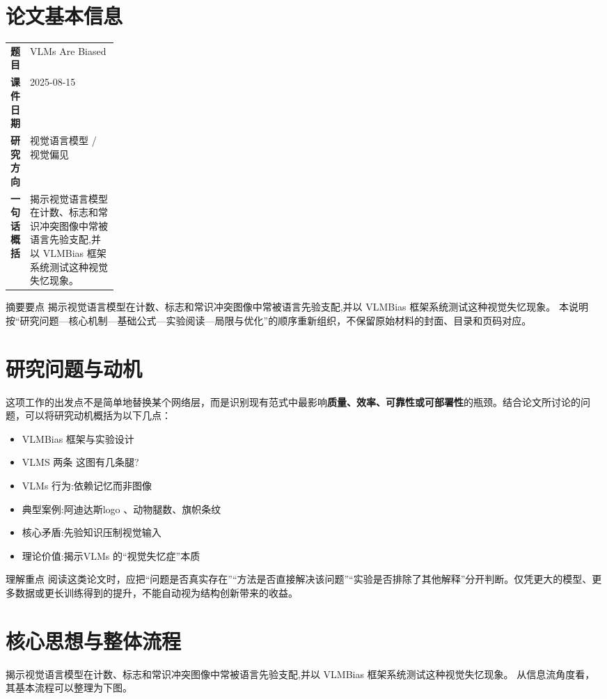\documentclass[UTF8,11pt,a4paper]{ctexart}
\newcommand{\term}[1]{\textbf{\textcolor{mainblue}{#1}}}
\begin{document}
\section{论文基本信息}
\begin{center}
\begin{tabularx}{0.94\linewidth}{>{\bfseries}p{0.18\linewidth}X}
\toprule
题目 & VLMs Are Biased\\
课件日期 & 2025-08-15\\
研究方向 & 视觉语言模型 / 视觉偏见\\
一句话概括 & 揭示视觉语言模型在计数、标志和常识冲突图像中常被语言先验支配,并以 VLMBias 框架系统测试这种视觉失忆现象。\\
\bottomrule
\end{tabularx}
\end{center}

\begin{infobox}{摘要要点}
揭示视觉语言模型在计数、标志和常识冲突图像中常被语言先验支配,并以 VLMBias 框架系统测试这种视觉失忆现象。 本说明按“研究问题—核心机制—基础公式—实验阅读—局限与优化”的顺序重新组织，不保留原始材料的封面、目录和页码对应。
\end{infobox}

\section{研究问题与动机}
这项工作的出发点不是简单地替换某个网络层，而是识别现有范式中最影响\term{质量、效率、可靠性或可部署性}的瓶颈。结合论文所讨论的问题，可以将研究动机概括为以下几点：
\begin{itemize}
\item VLMBias 框架与实验设计
\item VLMS 两条 这图有几条腿?
\item VLMs 行为:依赖记忆而非图像
\item 典型案例:阿迪达斯logo 、动物腿数、旗帜条纹
\item 核心矛盾:先验知识压制视觉输入
\item 理论价值:揭示VLMs 的“视觉失忆症”本质
\end{itemize}

\begin{notebox}{理解重点}
阅读这类论文时，应把“问题是否真实存在”“方法是否直接解决该问题”“实验是否排除了其他解释”分开判断。仅凭更大的模型、更多数据或更长训练得到的提升，不能自动视为结构创新带来的收益。
\end{notebox}

\section{核心思想与整体流程}
揭示视觉语言模型在计数、标志和常识冲突图像中常被语言先验支配,并以 VLMBias 框架系统测试这种视觉失忆现象。 从信息流角度看，其基本流程可以整理为下图。
\end{document}
